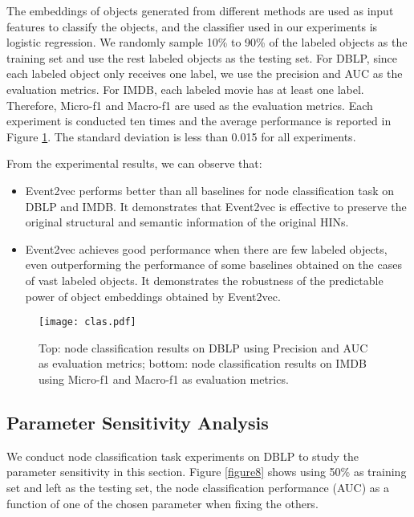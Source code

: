 The embeddings of objects generated from different methods are used as input features to classify the objects, and the classifier used in our experiments is logistic regression. We randomly sample 10\% to 90\% of the labeled objects as the training set and use the rest labeled objects as the testing set. For DBLP, since each labeled object only receives one label, we use the precision and AUC as the evaluation metrics. For IMDB, each labeled movie has at least one label. Therefore, Micro-f1 and Macro-f1 are used as the evaluation metrics. Each experiment is conducted ten times and the average performance is reported in Figure \ref{figure7}. The standard deviation is less than 0.015 for all experiments.

From the experimental results, we can observe that:

\begin{itemize}
	\item Event2vec performs better than all baselines for node classification task on DBLP and IMDB. It demonstrates that Event2vec is effective to preserve the original structural and semantic information of the original HINs.
	\item Event2vec achieves good performance when there are few labeled objects, even outperforming the performance of some baselines obtained on the cases of vast labeled objects. It demonstrates the robustness of the predictable power of object embeddings obtained by Event2vec.
\end{itemize}

\begin{figure}
	\centering
	\texttt{[image: clas.pdf]}
	\caption{{\small Top: node classification results on DBLP using Precision and AUC as evaluation metrics; bottom: node classification results on IMDB using Micro-f1 and Macro-f1 as evaluation metrics.}}\label{figure7}
\end{figure}

\begin{figure*}
	\centering
	\caption{{\small Parameter sensitivity in node classification.}}\label{figure8}
\end{figure*}

\subsection{Parameter Sensitivity Analysis}
We conduct node classification task experiments on DBLP to study the parameter sensitivity in this section. Figure \ref{figure8} shows using 50\% as training set and left as the testing set, the node classification performance (AUC) as a function of one of the chosen parameter when fixing the others.

